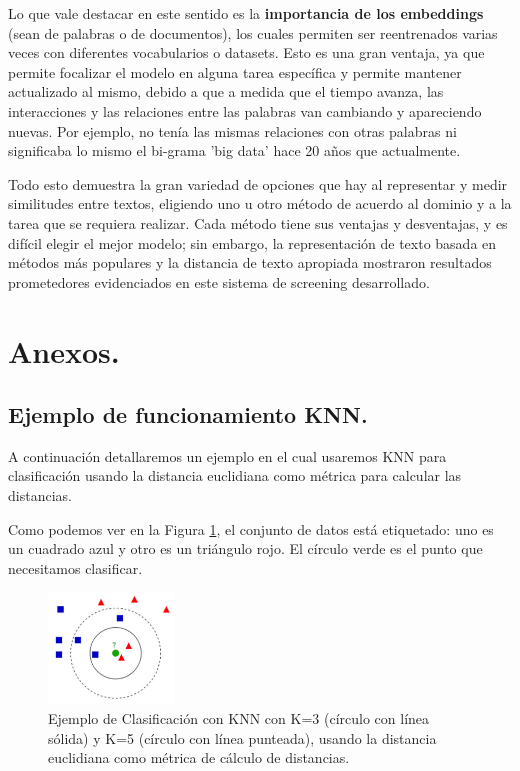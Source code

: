 \documentclass[12pt,a4paper]{article}
\begin{document}
\begin{sloppypar}
Lo que vale destacar en este sentido es la \textbf{importancia de los embeddings} (sean de palabras o de documentos), los cuales permiten ser reentrenados varias veces con diferentes vocabularios o datasets. Esto es una gran ventaja, ya que permite focalizar el modelo en alguna tarea específica y permite mantener actualizado al mismo, debido a que a medida que el tiempo avanza, las interacciones y las relaciones entre las palabras van cambiando y apareciendo nuevas. Por ejemplo, no tenía las mismas relaciones con otras palabras ni significaba lo mismo el bi-grama 'big data' hace 20 años que actualmente.

Todo esto demuestra la gran variedad de opciones que hay al representar y medir similitudes entre textos, eligiendo uno u otro método de acuerdo al dominio y a la tarea que se requiera realizar. Cada método tiene sus ventajas y desventajas, y es difícil elegir el mejor modelo; sin embargo, la representación de texto basada en métodos más populares y la distancia de texto apropiada mostraron resultados prometedores evidenciados en este sistema de screening desarrollado.

\cleardoublepage

\section{Anexos.}

\subsection{Ejemplo de funcionamiento KNN.}\label{anexo_knn}

A continuación detallaremos un ejemplo en el cual usaremos KNN para clasificación usando la distancia euclidiana como métrica para calcular las distancias. 

Como podemos ver en la Figura \ref{fig:KNN_example}, el conjunto de datos está etiquetado: uno es un cuadrado azul y otro es un triángulo rojo. El círculo verde es el punto que necesitamos clasificar. 

\begin{figure}[H]    %
 \centering
 \includegraphics[width=0.3\textwidth]{images/KNN_Ejemplo.png}
 \captionsetup{justification=centering,margin=2cm}
 \caption{Ejemplo de Clasificación con KNN con K=3 (círculo con línea sólida) y K=5 (círculo con línea punteada), usando la distancia euclidiana como métrica de cálculo de distancias\cite{KNN_Ejemplo}.} 
 \label{fig:KNN_example}
\end{figure}


\end{sloppypar}
\end{document}
